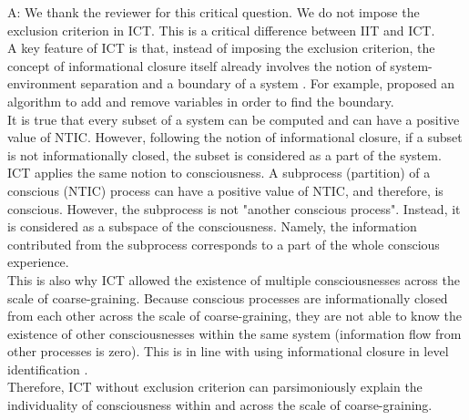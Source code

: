 \documentclass[utf8]{article}
\newenvironment{ans}  
    {\color{Black}\noindent A:}
    {~\newline}
\begin{document}
    	\begin{ans}
            We thank the reviewer for this critical question. We do not impose the exclusion criterion in ICT. This is a critical difference between IIT and ICT. \\
            A key feature of ICT is that, instead of imposing the exclusion criterion, the concept of informational closure itself already involves the notion of system-environment separation and a boundary of a system \citep{BERTSCHINGER.2006}. For example, \citet{krakauer2014information} proposed an algorithm to add and remove variables in order to find the boundary. \\
            It is true that every subset of a system can be computed and can have a positive value of NTIC. However, following the notion of informational closure, if a subset is not informationally closed, the subset is considered as a part of the system.
            ICT applies the same notion to consciousness. A subprocess (partition) of a conscious (NTIC) process can have a positive value of NTIC, and therefore, is conscious. However, the subprocess is not "another conscious process". Instead, it is considered as a subspace of the consciousness. Namely, the information contributed from the subprocess corresponds to a part of the whole conscious experience. \\
            This is also why ICT allowed the existence of multiple consciousnesses across the scale of coarse-graining. Because conscious processes are informationally closed from each other across the scale of coarse-graining, they are not able to know the existence of other consciousnesses within the same system (information flow from other processes is zero). This is in line with using informational closure in level identification \citep{PFANTE.2014} . \\
            Therefore, ICT without exclusion criterion can parsimoniously explain the individuality of consciousness within and across the scale of coarse-graining.
			

\end{ans}
\end{document}

